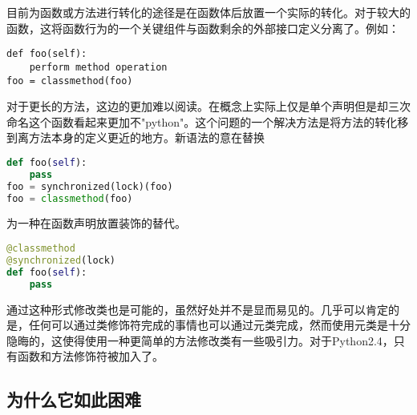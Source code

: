 \documentclass[../main.tex]{subfile}
\begin{document}
目前为函数或方法进行转化的途径是在函数体后放置一个实际的转化。对于较大的函数，这将函数行为的一个关键组件与函数剩余的外部接口定义分离了。例如：
\begin{lstlisting}
def foo(self):
    perform method operation
foo = classmethod(foo)
\end{lstlisting}

对于更长的方法，这边的更加难以阅读。在概念上实际上仅是单个声明但是却三次命名这个函数看起来更加不"python"。这个问题的一个解决方法是将方法的转化移到离方法本身的定义更近的地方。新语法的意在替换
\begin{lstlisting}[language=Python]
def foo(self):
    pass
foo = synchronized(lock)(foo)
foo = classmethod(foo)
\end{lstlisting}
为一种在函数声明放置装饰的替代。
\begin{lstlisting}[language=Python]
@classmethod
@synchronized(lock)
def foo(self):
    pass
\end{lstlisting}

通过这种形式修改类也是可能的，虽然好处并不是显而易见的。几乎可以肯定的是，任何可以通过类修饰符完成的事情也可以通过元类完成，然而使用元类是十分隐晦的，这使得使用一种更简单的方法修改类有一些吸引力。对于Python2.4，只有函数和方法修饰符被加入了。

\subsection{为什么它如此困难}
\end{document}

